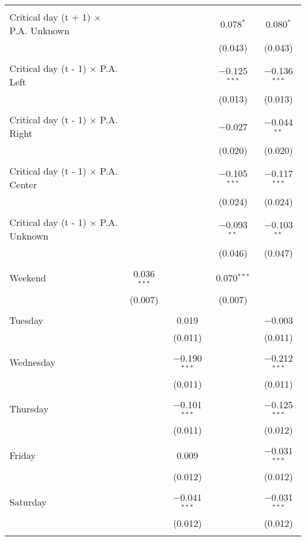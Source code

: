\documentclass[
]{article}
\begin{document}
\begin{table}[!htbp]
{\begin{tabular}{@{\extracolsep{5pt}}lcccc}
  & & & & \\ 
 Critical day (t + 1) $\times$ P.A. Unknown &  &  & 0.078$^{*}$ & 0.080$^{*}$ \\ 
  &  &  & (0.043) & (0.043) \\ 
  & & & & \\ 
 Critical day (t - 1) $\times$ P.A. Left &  &  & $-$0.125$^{***}$ & $-$0.136$^{***}$ \\ 
  &  &  & (0.013) & (0.013) \\ 
  & & & & \\ 
 Critical day (t - 1) $\times$ P.A. Right &  &  & $-$0.027 & $-$0.044$^{**}$ \\ 
  &  &  & (0.020) & (0.020) \\ 
  & & & & \\ 
 Critical day (t - 1) $\times$ P.A. Center &  &  & $-$0.105$^{***}$ & $-$0.117$^{***}$ \\ 
  &  &  & (0.024) & (0.024) \\ 
  & & & & \\ 
 Critical day (t - 1) $\times$ P.A. Unknown &  &  & $-$0.093$^{**}$ & $-$0.103$^{**}$ \\ 
  &  &  & (0.046) & (0.047) \\ 
  & & & & \\ 
 Weekend & 0.036$^{***}$ &  & 0.070$^{***}$ &  \\ 
  & (0.007) &  & (0.007) &  \\ 
  & & & & \\ 
 Tuesday &  & 0.019 &  & $-$0.003 \\ 
  &  & (0.011) &  & (0.011) \\ 
  & & & & \\ 
 Wednesday &  & $-$0.190$^{***}$ &  & $-$0.212$^{***}$ \\ 
  &  & (0.011) &  & (0.011) \\ 
  & & & & \\ 
 Thursday &  & $-$0.101$^{***}$ &  & $-$0.125$^{***}$ \\ 
  &  & (0.011) &  & (0.012) \\ 
  & & & & \\ 
 Friday &  & 0.009 &  & $-$0.031$^{***}$ \\ 
  &  & (0.012) &  & (0.012) \\ 
  & & & & \\ 
 Saturday &  & $-$0.041$^{***}$ &  & $-$0.031$^{***}$ \\ 
  &  & (0.012) &  & (0.012) \\ 
  & & & & \\ 

\end{tabular}}
\end{table}
\end{document}

